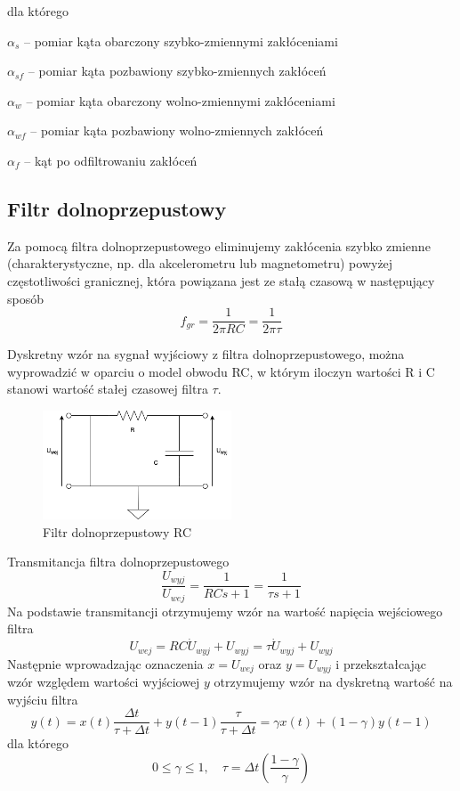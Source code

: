 dla którego

$\alpha_s$ -- pomiar kąta obarczony szybko-zmiennymi zakłóceniami

$\alpha_{sf}$ -- pomiar kąta pozbawiony szybko-zmiennych zakłóceń

$\alpha_w$ -- pomiar kąta obarczony wolno-zmiennymi zakłóceniami

$\alpha_{wf}$ -- pomiar kąta pozbawiony wolno-zmiennych zakłóceń

$\alpha_f$ -- kąt po odfiltrowaniu zakłóceń

\subsection{Filtr dolnoprzepustowy}

Za pomocą filtra dolnoprzepustowego eliminujemy zakłócenia szybko zmienne (charakterystyczne, np. dla akcelerometru lub magnetometru) powyżej częstotliwości granicznej, która powiązana jest ze stałą czasową w następujący sposób
$$
    f_{gr} = \frac{1}{2\pi RC} = \frac{1}{2\pi\tau}
$$

Dyskretny wzór na sygnał wyjściowy z filtra dolnoprzepustowego, można wyprowadzić w oparciu o model obwodu RC, w którym iloczyn wartości R i C stanowi wartość stałej czasowej filtra $\tau$.

\begin{figure}[htb!]
    \centering
    \includegraphics[width=0.5\textwidth]{Rysunki/Rozdzial04/FIltr_dolnoprzepustowy.png}
    \caption{Filtr dolnoprzepustowy RC}
    \label{filtr dp}
\end{figure}

Transmitancja filtra dolnoprzepustowego
$$
    \frac{U_{wyj}}{U_{wej}} = \frac{1}{RCs + 1} = \frac{1}{\tau s + 1}
$$
Na podstawie transmitancji otrzymujemy wzór na wartość napięcia wejściowego filtra
$$
     U_{wej} = RC\Dot{U}_{wyj} + U_{wyj} = \tau \Dot{U}_{wyj} + U_{wyj}
$$
Następnie wprowadzając oznaczenia $x = U_{wej}$ oraz $y = U_{wyj}$ i przekształcając wzór względem wartości wyjściowej $y$ otrzymujemy wzór na dyskretną wartość na wyjściu filtra 
\begin{equation}
    y(t) = x(t)\frac{\Delta t}{\tau + \Delta t} + y(t-1)\frac{\tau}{\tau + \Delta t} = \gamma x(t) + (1 - \gamma)y(t-1)
    \label{wyjscie dp}
\end{equation}
dla którego
$$
    0 \leq \gamma \leq 1,
    \quad
    \tau = \Delta t\left(\frac{1 - \gamma}{\gamma}\right)
$$


